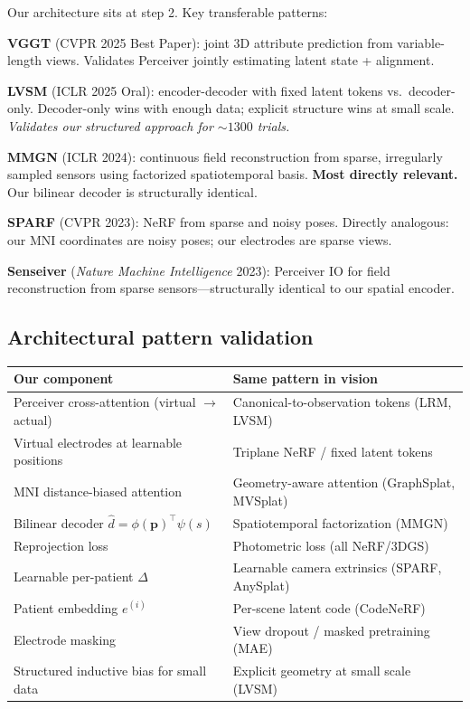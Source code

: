 \documentclass[11pt,letterpaper]{article}
\newcommand{\bfp}{\mathbf{p}}
\begin{document}
Our architecture sits at step 2. Key transferable patterns:

\textbf{VGGT} (CVPR 2025 Best Paper): joint 3D attribute prediction from variable-length views. Validates Perceiver jointly estimating latent state + alignment.

\textbf{LVSM} (ICLR 2025 Oral): encoder-decoder with fixed latent tokens vs.\ decoder-only. Decoder-only wins with enough data; explicit structure wins at small scale. \textit{Validates our structured approach for ${\sim}1300$ trials.}

\textbf{MMGN} (ICLR 2024): continuous field reconstruction from sparse, irregularly sampled sensors using factorized spatiotemporal basis. \textbf{Most directly relevant.} Our bilinear decoder is structurally identical.

\textbf{SPARF} (CVPR 2023): NeRF from sparse and noisy poses. Directly analogous: our MNI coordinates are noisy poses; our electrodes are sparse views.

\textbf{Senseiver} (\textit{Nature Machine Intelligence} 2023): Perceiver IO for field reconstruction from sparse sensors---structurally identical to our spatial encoder.

\subsection{Architectural pattern validation}

\begin{table}[h]\centering\small
\begin{tabular}{@{}p{}p{}@{}}
\toprule
\textbf{Our component} & \textbf{Same pattern in vision} \\
\midrule
Perceiver cross-attention (virtual $\to$ actual) & Canonical-to-observation tokens (LRM, LVSM) \\
Virtual electrodes at learnable positions & Triplane NeRF / fixed latent tokens \\
MNI distance-biased attention & Geometry-aware attention (GraphSplat, MVSplat) \\
Bilinear decoder $\hat{d} = \phi(\bfp)^\top\psi(s)$ & Spatiotemporal factorization (MMGN) \\
Reprojection loss & Photometric loss (all NeRF/3DGS) \\
Learnable per-patient $\Delta$ & Learnable camera extrinsics (SPARF, AnySplat) \\
Patient embedding $e^{(i)}$ & Per-scene latent code (CodeNeRF) \\
Electrode masking & View dropout / masked pretraining (MAE) \\
Structured inductive bias for small data & Explicit geometry at small scale (LVSM) \\
\bottomrule
\end{tabular}
\end{table}
\end{document}
